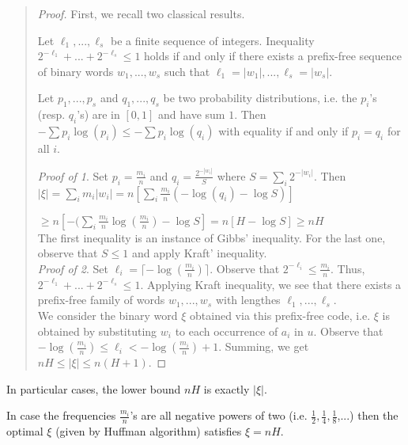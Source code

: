 {\small\begin{quote}
\begin{proof}
First, we recall two classical results.
\begin{theorem*}
Let $\ell_1,...,\ell_s$ be a finite sequence of integers.
Inequality $2^{-\ell_1}+...+2^{-\ell_s} \leq 1$ holds
if and only if there exists a prefix-free sequence of binary words
$w_1,...,w_s$ such that $\ell_1=|w_1|,...,\ell_s=|w_s|$.
\end{theorem*}
\begin{theorem*}
Let $p_1,...,p_s$ and $q_1,...,q_s$ be two probability
distributions, i.e. the $p_i$'s (resp. $q_i$'s) are in $[0,1]$
and have sum $1$.
Then
$-\sum p_i\log(p_i) \leq -\sum p_i\log(q_i)$
with equality if and only if $p_i=q_i$ for all $i$.
\end{theorem*}
{\em Proof of 1}.
Set $p_i=\frac{m_i}{n}$ and $q_i=\frac{2^{-|w_i|}}{S}$
where $S=\sum_i 2^{-|w_i|}$. Then
\medskip\\
$|\xi| = \sum_i m_i|w_i|
=n[\sum_i\frac{m_i}{n}(-\log(q_i) -\log S)]$

\hfill{$\geq n[-(\sum_i\frac{m_i}{n}\log(\frac{m_i}{n}) -\log S]
=n[H-\log S]
\geq nH$}
\medskip\\
The first inequality is an instance of Gibbs' inequality.
For the last one, observe that $S\leq1$ and apply Kraft' inequality.
\medskip\\
{\em Proof of 2}.
Set $\ell_i=\lceil-\log(\frac{m_i}{n})\rceil$.
Observe that $2^{-\ell_i} \leq \frac{m_i}{n}$.
Thus, $2^{-\ell_1}+...+2^{-\ell_s} \leq 1$.
Applying Kraft inequality, we see that there exists a prefix-free
family of words $w_1,...,w_s$ with lengthes $\ell_1,...,\ell_s$.
\\
We consider the binary word $\xi$ obtained via this prefix-free
code, i.e. $\xi$ is obtained by substituting $w_i$ to each
occurrence of $a_i$ in $u$.
Observe that
$-\log(\frac{m_i}{n}) \leq \ell_i < -\log(\frac{m_i}{n})+1$.
Summing, we get $nH \leq |\xi| \leq  n(H+1)$.
\end{proof}
\end{quote}}
\noindent
In particular cases, the lower bound $nH$ is exactly $|\xi|$.
\begin{theorem}
In case the frequencies $\frac{m_i}{n}$'s are all negative
powers of two (i.e. $\frac{1}{2},\frac{1}{4},\frac{1}{8}$,...)
then the optimal $\xi$ (given by Huffman algorithm)
satisfies $\xi=nH$.
\end{theorem}
